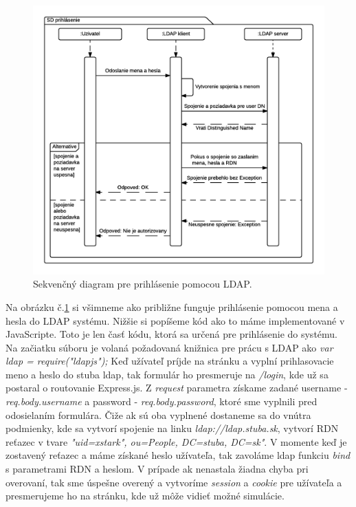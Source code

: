 \begin{figure}[H]
  \centering
  \includegraphics[scale=0.7]{img/diagrams/sequence-ldap.png}
  \caption{Sekvenčný diagram pre prihlásenie pomocou LDAP.}
  \label{img-sequence-ldap-login}
\end{figure}

Na obrázku č.\ref{img-sequence-ldap-login} si všimneme ako približne funguje prihlásenie pomocou mena a hesla do LDAP systému. Nižšie si popíšeme kód ako to máme implementované v JavaScripte. Toto je len časť kódu, ktorá sa určená pre prihlásenie do systému. Na začiatku súboru je volaná požadovaná knižnica pre prácu s LDAP ako \textit{var ldap = require("ldapjs");}
Keď užívateľ príjde na stránku a vyplní prihlasovacie meno a heslo do stuba ldap, tak formulár ho presmeruje na \textit{/login}, kde už sa postaral o routovanie Express.js. Z \textit{request} parametra získame zadané username - \textit{req.body.username} a password - \textit{req.body.password}, ktoré sme vyplnili pred odosielaním formulára. Čiže ak sú oba vyplnené dostaneme sa do vnútra podmienky, kde sa vytvorí spojenie na linku \textit{ldap://ldap.stuba.sk}, vytvorí RDN reťazec v tvare \textit{"uid=xstark", ou=People, DC=stuba, DC=sk"}.
V momente keď je zostavený reťazec a máme získané heslo užívateľa, tak zavoláme ldap funkciu \textit{bind} s parametrami RDN a heslom. V prípade ak nenastala žiadna chyba pri overovaní, tak sme úspešne overený a vytvoríme \textit{session} a \textit{cookie} pre užívateľa a presmerujeme ho na stránku, kde už môže vidieť možné simulácie.

